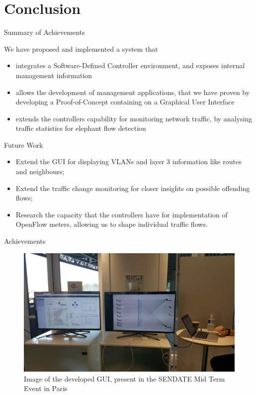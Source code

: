 \documentclass[aspectratio=43]{beamer}
\begin{document}
\section{Conclusion}

\begin{frame}{Summary of Achievements}
    \item We have proposed and implemented a system that
    \begin{itemize}
        \item integrates a Software-Defined Controller environment, and exposes internal
            management information

        \item allows the development of management applications, that we have proven 
            by developing a Proof-of-Concept containing on a Graphical User Interface

        \item extends the controllers capability for monitoring network traffic, 
            by analysing traffic statistics for elephant flow detection
    \end{itemize}
\end{frame}

\begin{frame}{Future Work}
    \begin{itemize}
        \item Extend the GUI for displaying VLANs and layer 3 information like routes and neighbours;
        \item Extend the traffic change monitoring for closer insights on possible offending flows;
        \item Research the capacity that the controllers have for implementation of OpenFlow meters,
            allowing us to shape individual traffic flows.
    \end{itemize}
\end{frame}

\begin{frame}{Achievements}
    \begin{figure}
        \includegraphics[width=.9\textwidth]{presentation/basebox_paris}
        \caption{Image of the developed GUI, present in the SENDATE Mid Term Event in Paris}
    \end{figure}
\end{frame}

\printbibliography
\end{document}
